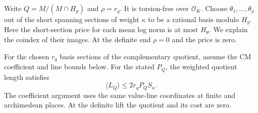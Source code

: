 Write \(Q=M/(M\cap H_g)\) and \(\rho=r_q\). It is torsion-free
over \(\mathcal O_K\). Choose \(\theta_1,\ldots,\theta_\rho\)
out of the short spanning sections of weight \(\kappa\) to be
a rational basis modulo \(H_g\). Here the short-section price
for each mean log norm is at most \(H_\theta\). We explain
the coindex of their images. At the definite end \(\rho=0\)
and the price is zero.

\begin{proposition}\label{prop:slice-complement-determinant-cost}
For the chosen \(r_q\) basis sections of the complementary
quotient, assume the CM coefficient and line bounds below.
For the stated \(P_Q\), the weighted quotient length satisfies
\[
 \langle L_Q\rangle\le2r_qP_Q S_\kappa.
\]
 The coefficient argument uses the same value-line
coordinates at finite and archimedean places. At the definite
lift the quotient and its cost are zero.
\end{proposition}

